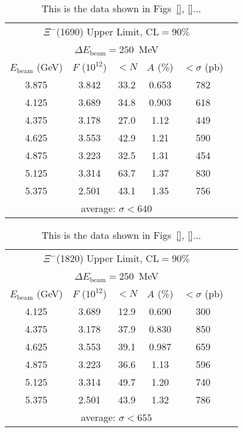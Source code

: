 \begin{table}[bh]\begin{center}
\caption[\texorpdfstring{$\Xi^-$}{Xi-}(1690) Upper Limit]{\label{tab:xi1690.ulimit}This is the data shown in Figs~\ref{}, \ref{}...}
\begin{tabular}{cccccc}
\hline \hline
\multicolumn{5}{c}{$\Xi^-$(1690) Upper Limit, CL$ = 90\%$} \\
\multicolumn{5}{c}{$\Delta E_\mathrm{beam} = 250$~MeV} \\
\hline
$E_\mathrm{beam}$ (GeV) & $F$ ($10^{12}$) & $< N$ & $A$ (\%) & $< \sigma$ (pb) \\
\hline
3.875 & 3.842 & 33.2 & 0.653 & 782 \\
4.125 & 3.689 & 34.8 & 0.903 & 618 \\
4.375 & 3.178 & 27.0 & 1.12 & 449 \\
4.625 & 3.553 & 42.9 & 1.21 & 590 \\
4.875 & 3.223 & 32.5 & 1.31 & 454 \\
5.125 & 3.314 & 63.7 & 1.37 & 830 \\
5.375 & 2.501 & 43.1 & 1.35 & 756 \\


\hline
\multicolumn{5}{c}{average: $\sigma < 640$} \\
\hline \hline
\end{tabular}

\end{center}\end{table}

\begin{table}[bh]\begin{center}
\caption[\texorpdfstring{$\Xi^-$}{Xi-}(1820) Upper Limit]{\label{tab:xi1820.ulimit}This is the data shown in Figs~\ref{}, \ref{}...}
\begin{tabular}{cccccc}
\hline \hline
\multicolumn{5}{c}{$\Xi^-$(1820) Upper Limit, CL$ = 90\%$} \\
\multicolumn{5}{c}{$\Delta E_\mathrm{beam} = 250$~MeV} \\
\hline
$E_\mathrm{beam}$ (GeV) & $F$ ($10^{12}$) &  $< N$ & $A$ (\%) & $< \sigma$ (pb) \\
\hline
4.125 & 3.689 & 12.9 & 0.690 & 300 \\
4.375 & 3.178 & 37.9 & 0.830 & 850 \\
4.625 & 3.553 & 39.1 & 0.987 & 659 \\
4.875 & 3.223 & 36.6 & 1.13 & 596 \\
5.125 & 3.314 & 49.7 & 1.20 & 740 \\
5.375 & 2.501 & 43.9 & 1.32 & 786 \\


\hline
\multicolumn{5}{c}{average: $\sigma < 655$} \\
\hline \hline
\end{tabular}

\end{center}\end{table}

\clearpage

